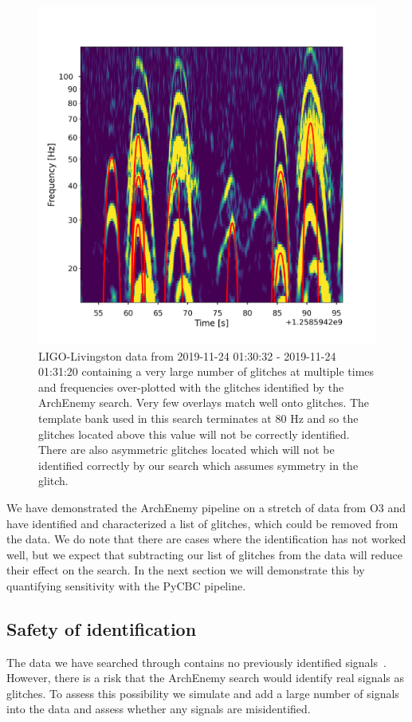 \begin{figure}
       \centering
    \includegraphics[width=0.7\linewidth]{images/archenemy/Section3/3.7/overlay_bad_overlays.pdf}
    \caption{LIGO-Livingston data from 2019-11-24 01:30:32 - 2019-11-24 01:31:20 containing a very large number of \scl{} glitches at multiple times and frequencies over-plotted with the \scl{} glitches identified by the ArchEnemy search. Very few overlays match well onto \scl{} glitches. The template bank used in this search terminates at $80$ Hz and so the \scl{} glitches located above this value will not be correctly identified. There are also asymmetric \scl{} glitches located which will not be identified correctly by our search which assumes symmetry in the \scl{} glitch.}
    \label{fig:overlay_bads}
\end{figure}

We have demonstrated the ArchEnemy pipeline on a stretch of data from O3 and have identified and characterized a list of \scl{} glitches, which could be removed from the data. We do note that there are cases where the identification has not worked well, but we expect that subtracting our list of glitches from the data will reduce their effect on the \gw{} search. In the next section we will demonstrate this by quantifying sensitivity with the PyCBC pipeline.

\subsection{Safety of \scl{} identification}
\label{ssec:injsafety}

The data we have searched through contains no previously identified \gw{} signals~\cite{gwtc3}. However, there is a risk that the ArchEnemy search would identify real \gw{} signals as \scl{} glitches. To assess this possibility we simulate and add a large number of \gw{} signals into the data and assess whether any signals are misidentified.

